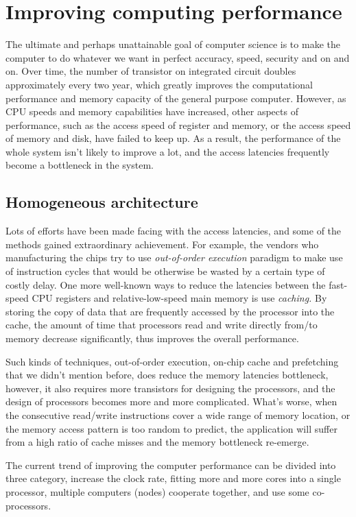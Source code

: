 \section{Improving computing performance}
The ultimate and perhaps unattainable goal of computer science is
to make the computer to do whatever we want in perfect accuracy, speed,
security and on and on. Over time, the number of transistor on integrated
circuit doubles approximately every two year, which greatly improves
the computational performance and memory capacity of the general purpose
computer. However, as CPU speeds and memory capabilities have increased,
other aspects of performance, such as the access speed of register
and memory, or the access speed of memory and disk, have failed to
keep up. As a result, the performance of the whole system isn't likely
to improve a lot, and the access latencies frequently become a bottleneck
in the system.

\subsection{Homogeneous architecture} %
\label{ssub:Homogeneous architecture}

Lots of efforts have been made facing with the access latencies, and
some of the methods gained extraordinary achievement. For example,
the vendors who manufacturing the chips try to use \emph {out-of-order
execution}  paradigm to make use of instruction cycles that would
be otherwise be wasted by a certain type of costly delay. One more
well-known ways to reduce the latencies between the fast-speed CPU
registers and relative-low-speed main memory is use \emph {caching.}
By storing the copy of data that are frequently accessed by the
processor into the cache, the amount of time that processors read
and write directly from/to memory decrease significantly, thus improves
the overall performance.

Such kinds of techniques, out-of-order execution, on-chip cache and
prefetching that we didn't mention before, does reduce the memory
latencies bottleneck, however, it also requires more transistors for
designing the processors, and the design of processors becomes more
and more complicated. What's worse, when the consecutive read/write
instructions cover a wide range of memory location, or the memory
access pattern is too random to predict, the application will suffer
from a high ratio of cache misses and the memory bottleneck re-emerge\cite{fu11}.

The current trend of improving the computer performance can be divided
into three category, increase the clock rate, fitting more and more
cores into a single processor, multiple computers (nodes) cooperate
together, and use some co-processors.

